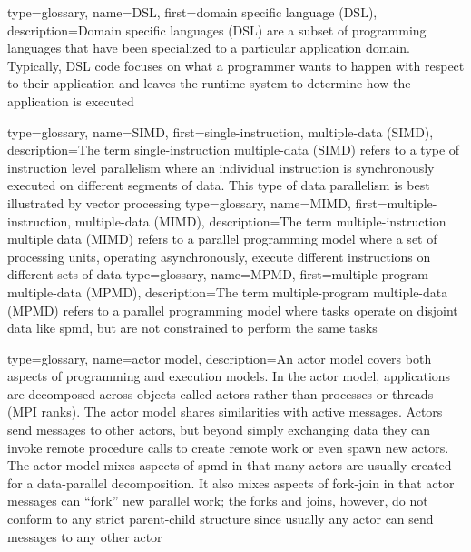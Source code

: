 {
  type=glossary,
  name={DSL},
  first={domain specific language (DSL)},
  description={Domain specific languages (DSL) are a subset of
    \glspl{programming language} that have been specialized to a particular
      application domain. Typically, DSL code focuses on what a programmer
      wants to happen with respect to their application and leaves the
      \gls{runtime system} to determine how the application is executed}
}

{
  type=glossary,
  name={SIMD},
  first={single-instruction, multiple-data (SIMD)},
  description={The term single-instruction multiple-data (SIMD) refers to a type of instruction level parallelism where an individual instruction is synchronously executed on different segments of data. This type of \gls{data parallelism} is best illustrated by \gls{vector processing}}
}
{
  type=glossary,
  name={MIMD},
  first={multiple-instruction, multiple-data (MIMD)},
  description={The term multiple-instruction multiple data (MIMD) refers to a parallel \gls{programming model} where a set of processing units, operating asynchronously, execute different instructions on different sets of data}
}
{
  type=glossary,
  name={MPMD},
  first={multiple-program multiple-data (MPMD)},
  description={The term multiple-program multiple-data (MPMD) refers to a
    parallel programming model where tasks operate on disjoint data like \gls{spmd}, but are not constrained to perform the same tasks}
}

{
  type=glossary,
  name={actor model},
  description={An actor model covers both aspects of programming and
    \glspl{execution model}.  In the actor model,
  applications are decomposed across objects called actors rather than processes or threads (\gls{MPI} ranks). The actor model shares similarities with active messages.  Actors send messages to other actors, but beyond simply exchanging data they can invoke remote procedure calls to create remote work or even spawn new actors.  The actor model mixes aspects of \gls{spmd} in that many actors are usually created for a data-parallel decomposition.  It also mixes aspects of \gls{fork-join} in that actor messages can ``fork'' new parallel work; the forks and joins, however, do not conform to any strict parent-child structure since usually any actor can send messages to any other actor}  
}

